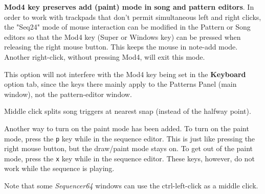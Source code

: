 
   \label{new_mod4_mode}
   \textbf{Mod4 key preserves add (paint) mode in song and pattern editors}.
   In order to work with trackpads that don't permit simultaneous left
   and right clicks, the
   "Seq24" mode of mouse interaction can be modified in the
   Pattern or Song editors so that the Mod4 key (Super or Windows key)
   can be pressed when releasing the right mouse button.
   This keeps the mouse in note-add mode.
   Another right-click, without pressing Mod4, will exit this mode.


   This option will not interfere with the Mod4 key being set
   in the \textbf{Keyboard} option tab, since the keys there mainly apply to
   the Patterns Panel (main window), not the pattern-editor window.

   \label{new_split_mode}
   Middle click splits song triggers at nearest snap (instead of
   the halfway point).

   Another way to turn on the paint mode has been added.
   To turn on the paint mode, press the
   \texttt{p} key while in the sequence editor.
   This is just like pressing the right mouse button, but the draw/paint mode
   stays on.
   To get out of the paint mode, press the
   \texttt{x} key while in the sequence editor.
   These keys, however, do not work while the sequence is playing.

   Note that some \textsl{Sequencer64} windows
   can use the ctrl-left-click as a middle click. 
 
